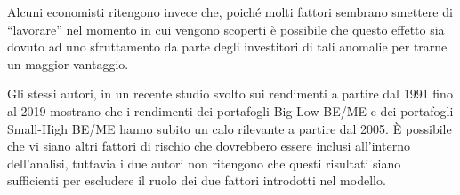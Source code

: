 Alcuni economisti ritengono invece che, poiché molti fattori sembrano smettere di “lavorare” nel momento in cui vengono scoperti è possibile che questo effetto sia dovuto ad uno sfruttamento da parte degli investitori di tali anomalie per trarne un maggior vantaggio. 

Gli stessi autori, in un recente studio svolto sui rendimenti a partire dal 1991 fino al 2019 mostrano che i rendimenti dei portafogli Big-Low BE/ME e dei portafogli Small-High BE/ME  hanno subito un calo rilevante a partire dal 2005. \`E possibile che vi siano altri fattori di rischio che dovrebbero essere inclusi all'interno dell'analisi, tuttavia i due autori non ritengono che questi risultati siano sufficienti per escludere il ruolo dei due fattori introdotti nel modello. 
